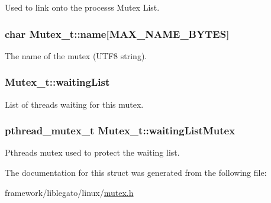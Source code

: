 Used to link onto the process\textquotesingle{}s Mutex List. 

\subsubsection[{\texorpdfstring{name}{name}}]{\setlength{\rightskip}{0pt plus 5cm}char Mutex\+\_\+t\+::name\mbox{[}{\bf M\+A\+X\+\_\+\+N\+A\+M\+E\+\_\+\+B\+Y\+T\+ES}\mbox{]}}\hypertarget{struct_mutex__t_a9296c665a3436da60ab839a401ca4e94}{}\label{struct_mutex__t_a9296c665a3436da60ab839a401ca4e94}


The name of the mutex (U\+T\+F8 string). 

\subsubsection[{\texorpdfstring{waiting\+List}{waitingList}}]{ Mutex\+\_\+t\+::waiting\+List}\hypertarget{struct_mutex__t_a21dcb357f71b30a5b18605053488120b}{}\label{struct_mutex__t_a21dcb357f71b30a5b18605053488120b}


List of threads waiting for this mutex. 

\subsubsection[{\texorpdfstring{waiting\+List\+Mutex}{waitingListMutex}}]{\setlength{\rightskip}{0pt plus 5cm}pthread\+\_\+mutex\+\_\+t Mutex\+\_\+t\+::waiting\+List\+Mutex}\hypertarget{struct_mutex__t_a91d431e8425a4660419866d73128184b}{}\label{struct_mutex__t_a91d431e8425a4660419866d73128184b}


Pthreads mutex used to protect the waiting list. 



The documentation for this struct was generated from the following file\+:\begin{DoxyCompactItemize}
\item 
framework/liblegato/linux/\hyperlink{mutex_8h}{mutex.\+h}\end{DoxyCompactItemize}
